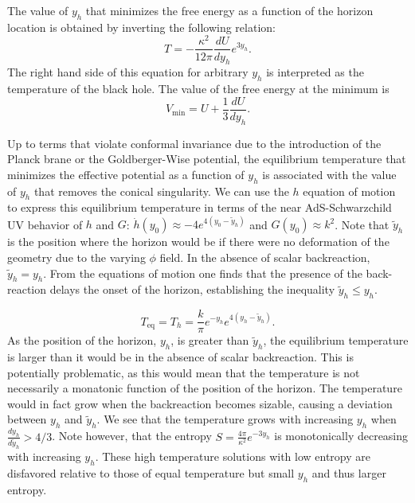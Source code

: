 \documentclass[12pt]{article}
\renewcommand{\tilde}{\widetilde} %
\begin{document}
  The value of $y_h$ that minimizes the free energy as a function of the horizon location is obtained by inverting the following relation:
\begin{equation}
T = -\frac{\kappa^2}{12 \pi} \frac{dU}{d y_h} e^{3 y_h}.
\end{equation}
The right hand side of this equation for arbitrary $y_h$ is interpreted as the temperature of the black hole.  The value of the free energy at the minimum is
\begin{equation}
V_\text{min} = U+ \frac{1}{3} \frac{dU}{d y_h}.
\end{equation}

Up to terms that violate conformal invariance due to the introduction of the Planck brane or the Goldberger-Wise potential, the equilibrium temperature that minimizes the effective potential as a function of $y_h$ is associated with the value of $y_h$ that removes the conical singularity.
We can use the $h$ equation of motion to express this equilibrium temperature in terms of the near AdS-Schwarzchild UV behavior of $h$ and $G$: $\dot{h}(y_0) \approx -4 e^{4 (y_0-\tilde{y}_h)}$ and $G(y_0) \approx k^2$.  Note that $\tilde{y}_h$ is the position where the horizon would be if there were no deformation of the geometry due to the varying $\phi$ field.  In the absence of scalar backreaction, $\tilde{y}_h = y_h$.  From the equations of motion one finds that the presence of the back-reaction delays the onset of the horizon, establishing the inequality $\tilde{y}_h \le y_h$.  

\begin{equation}
T_\text{eq} = T_h = \frac{k}{\pi} e^{-y_h} e^{4 (y_h -\tilde{y}_h)}.
\label{eq:Th}
\end{equation}
As the position of the horizon, $y_h$, is greater than $\tilde{y}_h$, the equilibrium temperature is larger than it would be in the absence of scalar backreaction.  This is potentially problematic, as this would mean that the temperature is not necessarily a monatonic function of the position of the horizon.  The temperature would in fact grow when the backreaction becomes sizable, causing a deviation between $y_h$ and $\tilde{y}_h$.  We see that the temperature grows with increasing $y_h$ when $\frac{d y_h}{d \tilde{y}_h} > 4/3$.  Note however, that the entropy $S = \frac{4\pi}{\kappa^2} e^{-3y_h}$ is monotonically decreasing with increasing $y_h$. These high temperature solutions with low entropy are disfavored relative to those of equal temperature but small $y_h$ and thus larger entropy.
\end{document}
